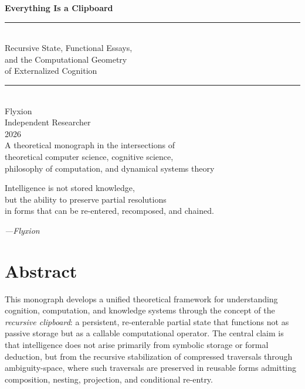\documentclass[12pt,oneside]{book}
\theoremstyle{plain}
\theoremstyle{definition}
\theoremstyle{plain}
\begin{document}
\begin{titlepage}
\centering
\vspace*{1.5in}
{\fontsize{28}{34}\selectfont\bfseries\color{clipblue}
Everything Is a Clipboard}\\[0.5em]
{\large\color{clipgray} \rule{4in}{0.4pt}}\\[1em]
{\large Recursive State, Functional Essays,\\[0.3em]
and the Computational Geometry\\[0.3em]
of Externalized Cognition}\\[2em]
{\large\color{clipgray} \rule{4in}{0.4pt}}\\[2em]
{\Large Flyxion}\\[0.5em]
{\normalsize Independent Researcher}\\[2.5em]
{\normalsize 2026}\\[3em]
\vfill
{\small\color{clipgray}
A theoretical monograph in the intersections of\\
theoretical computer science, cognitive science,\\
philosophy of computation, and dynamical systems theory}
\end{titlepage}

\frontmatter

\thispagestyle{empty}
\vspace*{3in}
\begin{center}
\epigraph{%
Intelligence is not stored knowledge,\\
but the ability to preserve partial resolutions\\
in forms that can be re-entered, recomposed, and chained.%
}{\textit{---Flyxion}}
\end{center}
\vfill
\clearpage

\chapter*{Abstract}

This monograph develops a unified theoretical framework for understanding cognition, computation, and knowledge systems through the concept of the \emph{recursive clipboard}: a persistent, re-enterable partial state that functions not as passive storage but as a callable computational operator. The central claim is that intelligence does not arise primarily from symbolic storage or formal deduction, but from the recursive stabilization of compressed traversals through ambiguity-space, where such traversals are preserved in reusable forms admitting composition, nesting, projection, and conditional re-entry.
\end{document}
